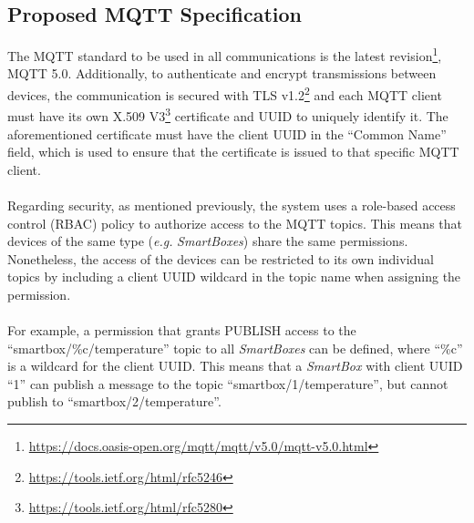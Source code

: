 \subsection{Proposed \acs{MQTT} Specification}

The \acs{MQTT} standard to be used in all communications is the latest revision\footnote{\url{https://docs.oasis-open.org/mqtt/mqtt/v5.0/mqtt-v5.0.html}}, MQTT 5.0. Additionally, to authenticate and encrypt transmissions between devices, the communication is secured with \acs{TLS} v1.2\footnote{\url{https://tools.ietf.org/html/rfc5246}} and each \acs{MQTT} client must have its own X.509 V3\footnote{\url{https://tools.ietf.org/html/rfc5280}} certificate and \acs{UUID} to uniquely identify it. 
The aforementioned certificate must have the client \acs{UUID} in the ``Common Name'' field, which is used to ensure that the certificate is issued to that specific \acs{MQTT} client.

\paragraph{} Regarding security, as mentioned previously, the system uses a role-based access control (\acs{RBAC}) policy to authorize access to the \acs{MQTT} topics. This means that devices of the same type (\textit{e.g.} \textit{SmartBoxes}) share the same permissions. 
Nonetheless, the access of the devices can be restricted to its own individual topics by including a client \acs{UUID} wildcard in the topic name when assigning the permission.


\paragraph{} For example, a permission that grants PUBLISH access to the ``smartbox/\%c/temperature'' topic to all \textit{SmartBoxes} can be defined, where ``\%c'' is a wildcard for the client \acs{UUID}. This means that a \textit{SmartBox} with client \acs{UUID} ``1'' can publish a message to the topic ``smartbox/1/temperature'', but cannot publish to ``smartbox/2/temperature''.

